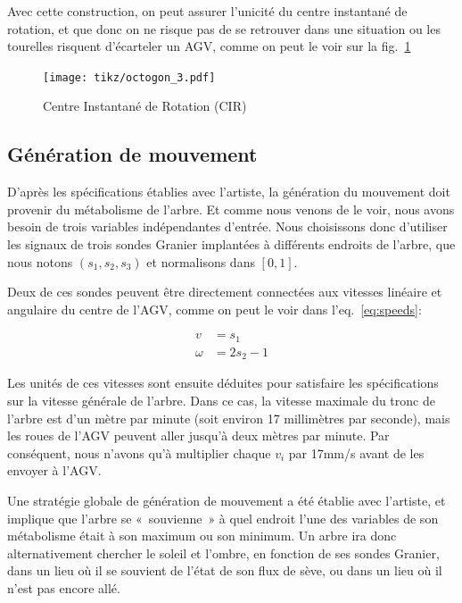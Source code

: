 \documentclass[french,A4paper,]{book}
\begin{document}
Avec cette construction, on peut assurer l'unicité du centre instantané
de rotation, et que donc on ne risque pas de se retrouver dans une
situation ou les tourelles risquent d'écarteler un AGV, comme on peut le
voir sur la fig.~\ref{fig:octogon3}

\begin{figure}
\centering
\texttt{[image: tikz/octogon\_3.pdf]}
\caption{Centre Instantané de Rotation (CIR)}\label{fig:octogon3}
\end{figure}

\subsection{Génération de mouvement}\label{sec:transgene}

D'après les spécifications établies avec l'artiste, la génération du
mouvement doit provenir du métabolisme de l'arbre. Et comme nous venons
de le voir, nous avons besoin de trois variables indépendantes d'entrée.
Nous choisissons donc d'utiliser les signaux de trois sondes Granier
implantées à différents endroits de l'arbre, que nous notons
\((s_1, s_2, s_3)\) et normalisons dans \([0, 1]\).

Deux de ces sondes peuvent être directement connectées aux vitesses
linéaire et angulaire du centre de l'AGV, comme on peut le voir dans
l'eq.~\ref{eq:speeds}:

\begin{equation} \begin{aligned}
    v &= s_1 \\
    \omega &= 2s_2 - 1
\end{aligned} \label{eq:speeds}\end{equation}

Les unités de ces vitesses sont ensuite déduites pour satisfaire les
spécifications sur la vitesse générale de l'arbre. Dans ce cas, la
vitesse maximale du tronc de l'arbre est d'un mètre par minute (soit
environ 17 millimètres par seconde), mais les roues de l'AGV peuvent
aller jusqu'à deux mètres par minute. Par conséquent, nous n'avons qu'à
multiplier chaque \(v_i\) par 17mm/s avant de les envoyer à l'AGV.

Une stratégie globale de génération de mouvement a été établie avec
l'artiste, et implique que l'arbre se «~souvienne~» à quel endroit l'une
des variables de son métabolisme était à son maximum ou son minimum. Un
arbre ira donc alternativement chercher le soleil et l'ombre, en
fonction de ses sondes Granier, dans un lieu où il se souvient de l'état
de son flux de sève, ou dans un lieu où il n'est pas encore allé.
\end{document}
